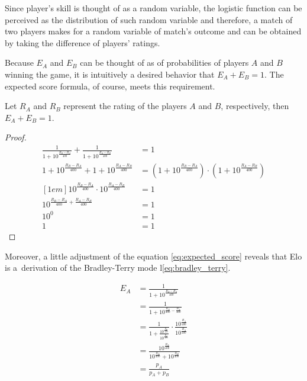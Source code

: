 Since player's skill is thought of as a random variable, the logistic function can be perceived as the distribution of such random variable and therefore, a match of two players makes for a random variable of match's outcome and can be obtained by taking the difference of players' ratings.

Because $E_A$ and $E_B$ can be thought of as of probabilities of players $A$ and $B$ winning the game, it is intuitively a desired behavior that $E_A + E_B = 1$. The expected score formula, of course, meets this requirement.

Let $R_A$ and $R_B$ represent the rating of the players $A$ and $B$, respectively, then $E_A + E_B = 1$.

\begin{proof}
\begin{equation*}
\begin{aligned}
\frac{1}{1+10^{\frac{R_B-R_A}{400}}} + \frac{1}{1+10^{\frac{R_A-R_B}{400}}} &= 1\\[1em]
1+10^\frac{R_B-R_A}{400} + 1+10^\frac{R_A-R_B}{400} &= \left(1+10^\frac{R_B-R_A}{400}\right)\cdot\left(1+10^\frac{R_A-R_B}{400}\right)\\ [1em]
10^{\frac{R_B-R_A}{400}} \cdot 10^{\frac{R_A-R_B}{400}} &= 1\\[1em]
10^{\frac{R_B-R_A}{400} + \frac{R_A-R_B}{400}} &= 1\\[1em]
10^0 &= 1\\[1em]
1 &= 1
\end{aligned}
\end{equation*}
\end{proof}

Moreover, a little adjustment of the equation \eqref{eq:expected_score} reveals that Elo is a~derivation of the Bradley-Terry mode l\eqref{eq:bradley_terry}.

\begin{equation*}
\begin{aligned}
E_A &= \frac{1}{1 + 10^{\frac{R_B-R_A}{400}}} \\[1em]
&= \frac{1}{1 + 10^{\frac{R_B}{400}-\frac{R_A}{400}}} \\[1em]
&= \frac{1}{1 + \frac{10^{\frac{R_B}{400}}}{10^{\frac{R_A}{400}}}}\cdot \frac{10^{\frac{R_A}{400}}}{10^{\frac{R_A}{400}}} \\[1em]
&= \frac{10^{\frac{R_A}{400}}}{10^{\frac{R_A}{400}}+10^{\frac{R_B}{400}}} \\[1em]
&= \frac{p_A}{p_A + p_B}
\end{aligned}
\end{equation*}


